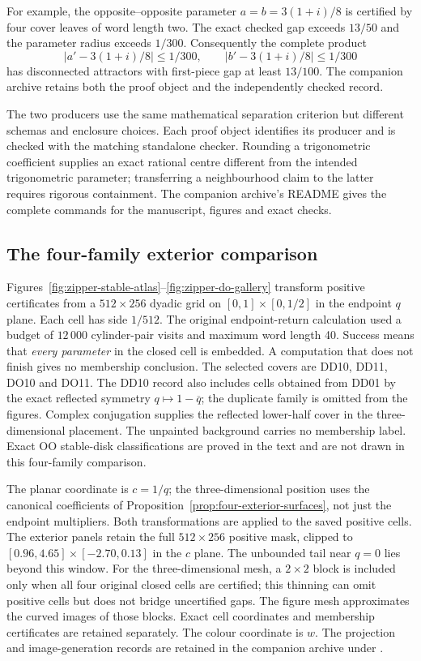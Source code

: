 For example, the opposite--opposite parameter
$a=b=3(1+i)/8$ is certified by four cover leaves of word length two.
The exact checked gap exceeds $13/50$ and the parameter radius exceeds
$1/300$. Consequently the complete product
\[
 |a'-3(1+i)/8|\le1/300,\qquad |b'-3(1+i)/8|\le1/300
\]
has disconnected attractors with first-piece gap at least $13/100$.
The companion archive retains both the proof object and the independently checked record.

The two producers use the same mathematical separation criterion but different
schemas and enclosure choices. Each proof object identifies its producer and
is checked with the matching standalone checker. Rounding a trigonometric
coefficient supplies an exact rational centre different from the intended
trigonometric parameter; transferring a neighbourhood claim to the latter
requires rigorous containment. The companion archive's README gives the complete commands for the manuscript, figures and exact checks.


\subsection{The four-family exterior comparison}
\label{app:zipper-computation}
Figures~\ref{fig:zipper-stable-atlas}--\ref{fig:zipper-do-gallery}
transform positive certificates from a $512\times256$ dyadic grid
on $[0,1]\times[0,1/2]$ in the endpoint $q$ plane. Each cell has side
$1/512$. The original endpoint-return calculation used a budget of
$12\,000$ cylinder-pair visits and maximum word length 40. Success
means that \emph{every parameter} in the closed cell is embedded.
A computation that does not finish gives no membership conclusion.
The selected covers are DD10, DD11, DO10 and DO11. The DD10 record
also includes cells obtained from DD01 by the exact reflected
symmetry $q\mapsto1-\overline q$; the duplicate family is omitted
from the figures. Complex conjugation supplies the reflected
lower-half cover in the three-dimensional placement. The unpainted
background carries no membership label. Exact OO stable-disk
classifications are proved in the text and are not drawn in this
four-family comparison.

The planar coordinate is $c=1/q$; the three-dimensional position
uses the canonical coefficients of
Proposition~\ref{prop:four-exterior-surfaces}, not just the endpoint
multipliers. Both transformations are applied to the saved positive
cells. The exterior panels retain the full $512\times256$ positive
mask, clipped to $[0.96,4.65]\times[-2.70,0.13]$ in the $c$ plane.
The unbounded tail near $q=0$ lies beyond this window. For the
three-dimensional mesh, a $2\times2$ block is included only when
all four original closed cells are certified; this thinning can
omit positive cells but does not bridge uncertified gaps. The
figure mesh approximates the curved images of those blocks. Exact
cell coordinates and membership certificates are retained
separately. The colour coordinate is $w$. The projection and image-generation
records are retained in the companion archive under .

